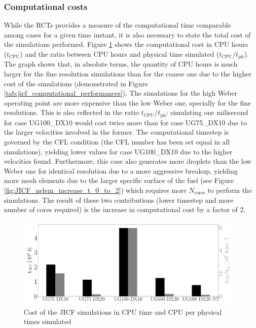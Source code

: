 \subsubsection*{Computational costs}
\label{subsec:ch5_JICF_computational_costs}

While the RCTs provides a measure of the computational time comparable among cases for a given time instant, it is also necessary to state the total cost of the simulations performed. Figure \ref{fig:SLI_cost_convergence_all} shows the computational cost in CPU hours ($t_\mathrm{CPU}$) and the ratio between CPU hours and physical time simulated ($t_\mathrm{CPU}/t_\mathrm{ph}$). The graph shows that, in absolute terms, the quantity of CPU hours is much larger for the fine resolution simulations than for the coarse one due to the higher cost of the simulations (demonstrated in Figure \ref{tab:jicf_computational_performances}). The simulations for the high Weber operating point are more expensive than the low Weber one, specially for the fine resolutions. This is also reflected in the ratio $t_\mathrm{CPU}/t_\mathrm{ph}$: simulating one milisecond for case UG100\_DX10 would cost twice more than for case UG75\_DX10 due to the larger velocities involved in the former. The computational timestep is governed by the CFL condition (the CFL number has been set equal in all simulations), yielding lower values for case UG100\_DX10 due to the higher velocities found. Furthermore, this case also generates more droplets than the low Weber one for identical resolution due to a more aggressive breakup, yielding more mesh elements due to the larger specific surface of the fuel (see Figure \ref{fig:JICF_nelem_increase_t_0_to_2}) which requires more $N_\mathrm{cores}$ to perform the simulations. The result of these two contributions (lower timestep and more number of cores required) is the increase in computational cost by a factor of 2.

\begin{figure}[ht]
	\centering
   \includegraphics[scale=0.225]{./part2_developments/figures_ch5_resolved_JICF/SLI_cost_for_convergence/cost_all_simulations}
   \caption{Cost of the JICF simulations in CPU time and CPU per physical times simulated}
   \label{fig:SLI_cost_convergence_all}
\end{figure}



